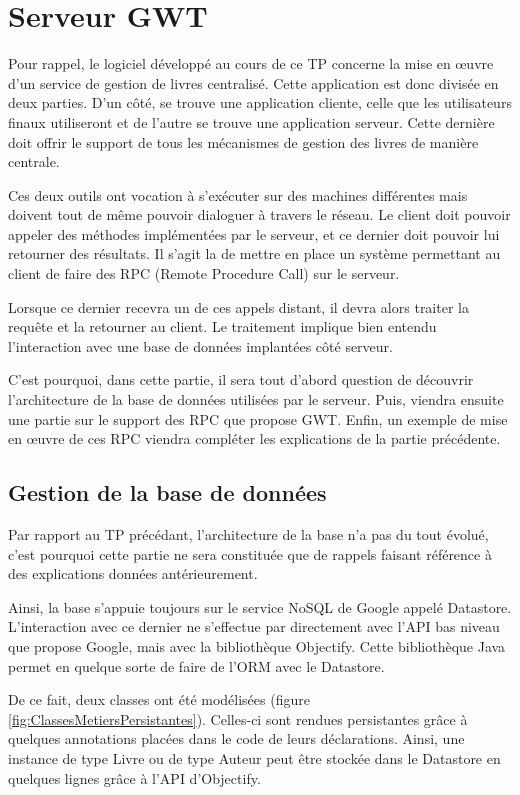 \chapter{Serveur GWT}
Pour rappel, le logiciel développé au cours de ce TP concerne la mise en œuvre d'un service de gestion de livres centralisé. Cette application est donc divisée en deux parties. D'un côté, se trouve une application cliente, celle que les utilisateurs finaux utiliseront et de l'autre se trouve une application serveur. Cette dernière doit offrir le support de tous les mécanismes de gestion des livres de manière centrale.

Ces deux outils ont vocation à s'exécuter sur des machines différentes mais doivent tout de même pouvoir dialoguer à travers le réseau. Le client doit pouvoir appeler des méthodes implémentées par le serveur, et ce dernier doit pouvoir lui retourner des résultats. Il s'agit la de mettre en place un système permettant au client de faire des RPC (Remote Procedure Call) sur le serveur.

Lorsque ce dernier recevra un de ces appels distant, il devra alors traiter la requête et la retourner au client. Le traitement implique bien entendu l'interaction avec une base de données implantées côté serveur.

C'est pourquoi, dans cette partie, il sera tout d'abord question de découvrir l'architecture de la base de données utilisées par le serveur. Puis, viendra ensuite une partie sur le support des RPC que propose GWT. Enfin, un exemple de mise en œuvre de ces RPC viendra compléter les explications de la partie précédente. 

\section{Gestion de la base de données}
Par rapport au TP précédant, l'architecture de la base n'a pas du tout évolué, c'est pourquoi cette partie ne sera constituée que de rappels faisant référence à des explications données antérieurement.

Ainsi, la base s'appuie toujours sur le service NoSQL de Google appelé Datastore. L'interaction avec ce dernier ne s'effectue par directement avec l'API bas niveau que propose Google, mais avec la bibliothèque Objectify. Cette bibliothèque Java permet en quelque sorte de faire de l'ORM avec le Datastore.

De ce fait, deux classes ont été modélisées (figure \ref{fig:ClassesMetiersPersistantes}). Celles-ci sont rendues persistantes grâce à quelques annotations placées dans le code de leurs déclarations. Ainsi, une instance de type Livre ou de type Auteur peut être stockée dans le Datastore en quelques lignes grâce à l'API d'Objectify.

